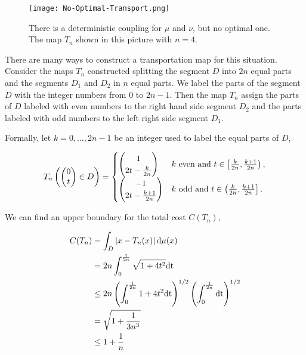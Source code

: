 \begin{figure}[H]
	\begin{center}
	\texttt{[image: No-Optimal-Transport.png]}
	\caption{There is a deterministic coupling for $\mu$ and $\nu$, but no optimal one. The map $T_n$ shown in this picture with $n=4$.}	
	\end{center}

\end{figure}


There are many ways to construct a transportation map for this situation. Consider the maps $T_n$ constructed splitting the segment $D$ into $2n$ equal parts and the segments $D_1$ and $D_2$ in $n$ equal parts. We label the parts of the segment $D$ with the integer numbers from $0$ to $2n-1$. Then the map $T_n$ assign the parts of $D$ labeled with even numbers to the right hand side segment $D_2$ and the parts labeled with odd numbers to the left right side segment $D_1$. 

Formally, let $k=0, \dots, 2n-1$ be an integer used to label the equal parts of $D$,

\begin{equation*}
T_n\left( \begin{pmatrix}0\\t\end{pmatrix}\in D \right)=\begin{cases}
\begin{pmatrix}1\\  2t - \frac{k}{2n}\end{pmatrix} & k \text{ even } \mathrm{and} \ t \in \left[\frac{k}{2n}, \frac{k+1}{2n}\right),  \\
\begin{pmatrix}-1 \\  2t- \frac{k+1}{2n}\end{pmatrix} &  k \text{ odd } \mathrm{and} \ t \in \left(\frac{k}{2n}, \frac{k+1}{2n}\right].
\end{cases}
\end{equation*}

We can find an upper boundary for the total cost $C(T_n)$,

\begin{align*}
C(T_n)&=\int_{D}\left| x-T_n(x) \right| \mathrm{d}\mu(x)\\&=2n\int_{0}^{\frac{1}{2n}}\sqrt{1+4t^2} \mathrm{dt}\\ &\leq 2n\left( \int_{0}^{\frac{1}{2n}}1+4t^2\mathrm{dt} \right)^{1/2}\left( \int_{0}^{\frac{1}{2n}}\mathrm{dt} \right)^{1/2}\\ &= \sqrt{1+\frac{1}{3n^3}}\\&\leq 1+\frac{1}{n}
\end{align*}

